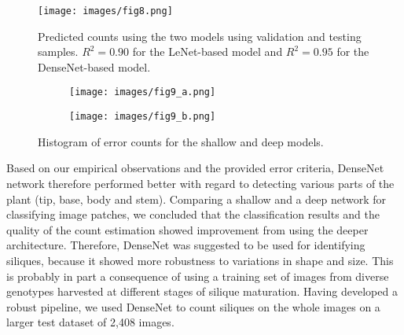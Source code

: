 \documentclass[a4paper,num-refs]{oup-contemporary}
\begin{document}
\begin{figure*}[!ht]
	\centering
	\texttt{[image: images/fig8.png]}
	\caption{Predicted counts using the two models using validation and testing samples. $R^2 = 0.90$ for the LeNet-based model and $R^2 = 0.95$ for the DenseNet-based model.}
	\label{scatter}
\end{figure*}
\begin{figure*}[!ht]
	\centering
	\begin{subfigure}[]{.48\textwidth}
		\texttt{[image: images/fig9\_a.png]}
	\end{subfigure}
	\begin{subfigure}[]{.458\textwidth}
		\texttt{[image: images/fig9\_b.png]}
	\end{subfigure}	
\caption{Histogram of error counts for the shallow and deep  models.}
	\label{hist}
\end{figure*}

Based on our empirical observations and the provided error criteria, DenseNet network therefore performed better with regard to detecting various parts of the plant (tip, base, body and stem). Comparing a shallow and a deep network for classifying image patches, we concluded that the classification results and the quality of the count estimation showed improvement from using the deeper architecture. 
Therefore,  DenseNet was suggested to be used for identifying siliques, because it showed more robustness to variations in shape and size. This is probably in part a consequence of using a training set of images from diverse genotypes harvested at different stages of silique maturation. Having developed a robust pipeline, we used  DenseNet to count siliques on the whole images on a larger test dataset of 2,408 images.
\end{document}
